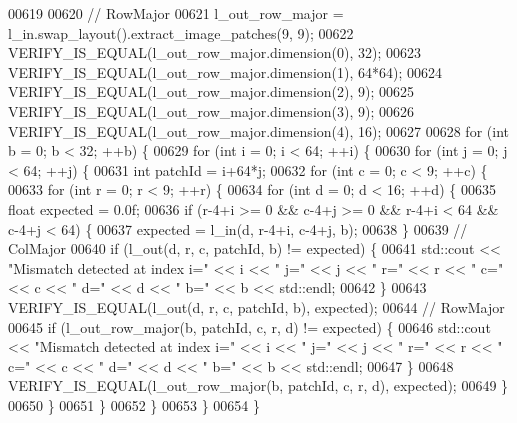 \begin{DoxyCode}
00619 
00620   \textcolor{comment}{// RowMajor}
00621   l\_out\_row\_major = l\_in.swap\_layout().extract\_image\_patches(9, 9);
00622   VERIFY\_IS\_EQUAL(l\_out\_row\_major.dimension(0), 32);
00623   VERIFY\_IS\_EQUAL(l\_out\_row\_major.dimension(1), 64*64);
00624   VERIFY\_IS\_EQUAL(l\_out\_row\_major.dimension(2), 9);
00625   VERIFY\_IS\_EQUAL(l\_out\_row\_major.dimension(3), 9);
00626   VERIFY\_IS\_EQUAL(l\_out\_row\_major.dimension(4), 16);
00627 
00628   \textcolor{keywordflow}{for} (\textcolor{keywordtype}{int} b = 0; b < 32; ++b) \{
00629     \textcolor{keywordflow}{for} (\textcolor{keywordtype}{int} i = 0; i < 64; ++i) \{
00630       \textcolor{keywordflow}{for} (\textcolor{keywordtype}{int} j = 0; j < 64; ++j) \{
00631         \textcolor{keywordtype}{int} patchId = i+64*j;
00632         \textcolor{keywordflow}{for} (\textcolor{keywordtype}{int} c = 0; c < 9; ++c) \{
00633           \textcolor{keywordflow}{for} (\textcolor{keywordtype}{int} r = 0; r < 9; ++r) \{
00634             \textcolor{keywordflow}{for} (\textcolor{keywordtype}{int} d = 0; d < 16; ++d) \{
00635               \textcolor{keywordtype}{float} expected = 0.0f;
00636               \textcolor{keywordflow}{if} (r-4+i >= 0 && c-4+j >= 0 && r-4+i < 64 && c-4+j < 64) \{
00637                 expected = l\_in(d, r-4+i, c-4+j, b);
00638               \}
00639               \textcolor{comment}{// ColMajor}
00640               \textcolor{keywordflow}{if} (l\_out(d, r, c, patchId, b) != expected) \{
00641                 std::cout << \textcolor{stringliteral}{"Mismatch detected at index i="} << i << \textcolor{stringliteral}{" j="} << j << \textcolor{stringliteral}{" r="} << r << \textcolor{stringliteral}{" c="} << c
       << \textcolor{stringliteral}{" d="} << d << \textcolor{stringliteral}{" b="} << b << std::endl;
00642               \}
00643               VERIFY\_IS\_EQUAL(l\_out(d, r, c, patchId, b), expected);
00644               \textcolor{comment}{// RowMajor}
00645               \textcolor{keywordflow}{if} (l\_out\_row\_major(b, patchId, c, r, d) != expected) \{
00646                 std::cout << \textcolor{stringliteral}{"Mismatch detected at index i="} << i << \textcolor{stringliteral}{" j="} << j << \textcolor{stringliteral}{" r="} << r << \textcolor{stringliteral}{" c="} << c
       << \textcolor{stringliteral}{" d="} << d << \textcolor{stringliteral}{" b="} << b << std::endl;
00647               \}
00648               VERIFY\_IS\_EQUAL(l\_out\_row\_major(b, patchId, c, r, d), expected);
00649             \}
00650           \}
00651         \}
00652       \}
00653     \}
00654   \}

\end{DoxyCode}
